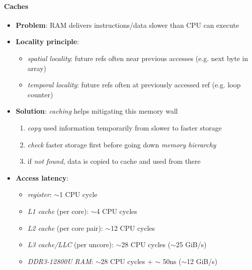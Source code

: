 \paragraph{Caches}
\begin{itemize}
	\item \textbf{Problem}: RAM delivers instructions/data slower than CPU can execute
	\item \textbf{Locality principle}:
	\begin{itemize}
		\item \emph{spatial locality}: future refs often near previous accesses (e.g. next byte in array)
		\item \emph{temporal locality}: future refs often at previously accessed ref (e.g. loop counter)
	\end{itemize}
	\item \textbf{Solution}: \emph{caching} helps mitigating this memory wall
	\begin{enumerate}
		\item \emph{copy} used information temporarily from slower to faster storage
		\item \emph{check} faster storage first before going down \emph{memory hierarchy} 
		\item if \emph{not found}, data is copied to cache and used from there
	\end{enumerate}
	\item \textbf{Access latency}:
	\begin{itemize}
		\item \emph{register}: $ \sim $1 CPU cycle
		\item \emph{L1 cache} (per core): $ \sim $4 CPU cycles
		\item \emph{L2 cache} (per core pair): $ \sim $12 CPU cycles
		\item \emph{L3 cache/LLC} (per uncore): $ \sim $28 CPU cycles ($ \sim $25 GiB/s) 
		\item \emph{DDR3-12800U RAM}: $ \sim $28 CPU cycles + $ \sim $ 50ns ($ \sim $12 GiB/s)
	\end{itemize}
\end{itemize}

